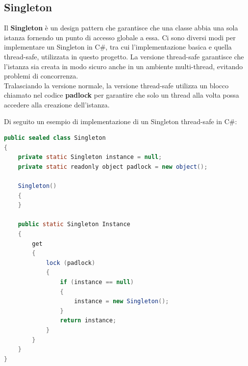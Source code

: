 \subsection{Singleton}
Il \textbf{Singleton} è un design pattern che garantisce che una classe abbia una sola istanza fornendo un punto di accesso globale a essa. Ci sono diversi modi per implementare un Singleton in C\#, tra cui l'implementazione basica e quella thread-safe, utilizzata in questo progetto. La versione thread-safe garantisce che l'istanza sia creata in modo sicuro anche in un ambiente multi-thread, evitando problemi di concorrenza.\\Tralasciando la versione normale, la versione thread-safe utilizza un blocco chiamato nel codice \textbf{padlock} per garantire che solo un thread alla volta possa accedere alla creazione dell'istanza. 
\vspace{10cm}

Di seguito un esempio di implementazione di un Singleton thread-safe in C\#:

\begin{lstlisting}[language=java]
public sealed class Singleton
{
    private static Singleton instance = null;
    private static readonly object padlock = new object();

    Singleton()
    {
    }

    public static Singleton Instance
    {
        get
        {
            lock (padlock)
            {
                if (instance == null)
                {
                    instance = new Singleton();
                }
                return instance;
            }
        }
    }
}


\end{lstlisting}
\cite{SingletonPatternCSharp}
